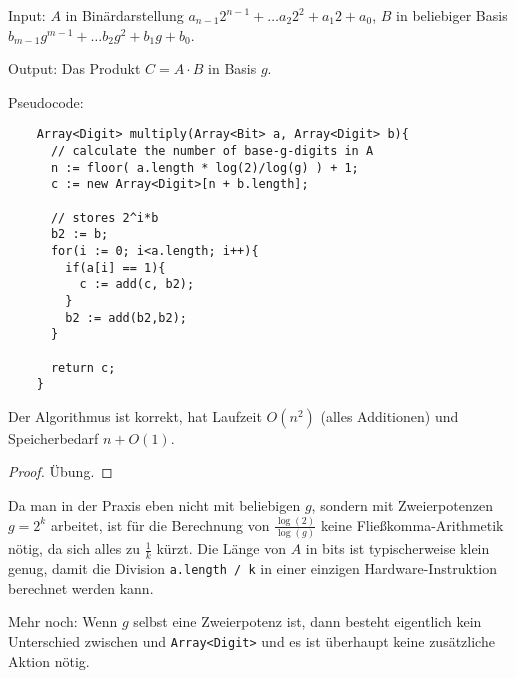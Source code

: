 \begin{algorithm}
    \label{alg:double-and-add}
    Input: $A$ in Binärdarstellung $a_{n-1}2^{n-1}+\ldots a_{2}2^2 +a_1 2 + a_0$, $B$ in beliebiger Basis $b_{m-1} g^{m-1} + \ldots b_2 g^2 + b_1 g+b_0$.

    Output: Das Produkt $C=A\cdot B$ in Basis $g$.

    Pseudocode:
    \begin{lstlisting}
    Array<Digit> multiply(Array<Bit> a, Array<Digit> b){
      // calculate the number of base-g-digits in A
      n := floor( a.length * log(2)/log(g) ) + 1;
      c := new Array<Digit>[n + b.length];

      // stores 2^i*b
      b2 := b;
      for(i := 0; i<a.length; i++){
        if(a[i] == 1){
          c := add(c, b2);
        }
        b2 := add(b2,b2);
      }

      return c;
    }
    \end{lstlisting}
\end{algorithm}

\begin{proposition}\label{alg:double-and-add:correctness}
    Der Algorithmus ist korrekt, hat Laufzeit $O(n^2)$ (alles Additionen) und Speicherbedarf $n+O(1)$.
\end{proposition}
\begin{proof}
Übung.
\end{proof}

\begin{remark}
    Da man in der Praxis eben nicht mit beliebigen $g$, sondern mit Zweierpotenzen $g=2^k$ arbeitet, ist für die Berechnung von $\frac{\log(2)}{\log(g)}$ keine Fließkomma-Arithmetik nötig, da sich alles zu $\frac{1}{k}$ kürzt. Die Länge von $A$ in bits ist typischerweise klein genug, damit die Division \texttt{a.length / k} in einer einzigen Hardware-Instruktion berechnet werden kann.

    \smallskip
    Mehr noch: Wenn $g$ selbst eine Zweierpotenz ist, dann besteht eigentlich kein Unterschied zwischen  und \texttt{Array<Digit>} und es ist überhaupt keine zusätzliche Aktion nötig.
\end{remark}
